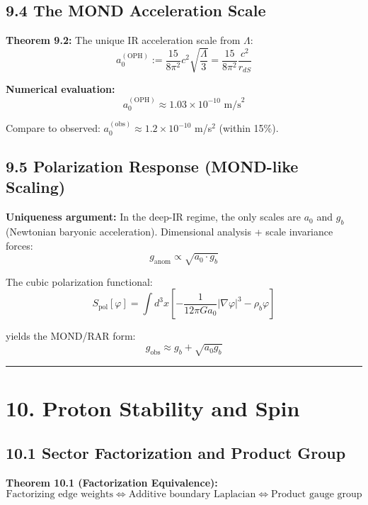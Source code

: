 \subsection{9.4 The MOND Acceleration Scale}\label{94-the-mond-acceleration-scale}

\textbf{Theorem 9.2:} The unique IR acceleration scale from \(\Lambda\): \[a_0^{(\text{OPH})} := \frac{15}{8\pi^2} c^2 \sqrt{\frac{\Lambda}{3}} = \frac{15}{8\pi^2} \frac{c^2}{r_{dS}}\]

\textbf{Numerical evaluation:} \[a_0^{(\text{OPH})} \approx 1.03 \times 10^{-10} \text{ m/s}^2\]

Compare to observed: \(a_0^{(\text{obs})} \approx 1.2 \times 10^{-10}\) m/s\(^2\) (within 15\%).

\subsection{9.5 Polarization Response (MOND-like Scaling)}\label{95-polarization-response-mond-like-scaling}

\textbf{Uniqueness argument:} In the deep-IR regime, the only scales are \(a_0\) and \(g_b\) (Newtonian baryonic acceleration). Dimensional analysis + scale invariance forces: \[g_{\text{anom}} \propto \sqrt{a_0 \cdot g_b}\]

The cubic polarization functional: \[S_{\text{pol}}[\varphi] = \int d^3x \left[-\frac{1}{12\pi G a_0}|\nabla\varphi|^3 - \rho_b \varphi\right]\]

yields the MOND/RAR form: \[g_{\text{obs}} \approx g_b + \sqrt{a_0 g_b}\]

\begin{center}\rule{0.5\linewidth}{0.5pt}\end{center}

\section{10. Proton Stability and Spin}\label{10-proton-stability-and-spin}

\subsection{10.1 Sector Factorization and Product Group}\label{101-sector-factorization-and-product-group}

\textbf{Theorem 10.1 (Factorization Equivalence):} \[\text{Factorizing edge weights} \Leftrightarrow \text{Additive boundary Laplacian} \Leftrightarrow \text{Product gauge group}\]

